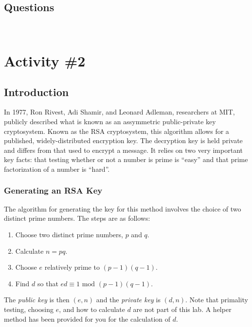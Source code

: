 		\subsection{Questions}
			\ \\[9pt]
	\pagebreak

	\section{Activity \#2}
		\subsection{Introduction}
			In 1977, Ron Rivest, Adi Shamir, and Leonard Adleman, researchers at MIT, publicly described what is known as an assymmetric public-private key cryptosystem. Known as the RSA cryptosystem, this algorithm allows for a published, widely-distributed encryption key. The decryption key is held private and differs from that used to encrypt a message. It relies on two very important key facts: that testing whether or not a number is prime is ``easy'' and that prime factorization of a number is ``hard''.

			\subsubsection*{Generating an RSA Key}
				The algorithm for generating the key for this method involves the choice of two distinct prime numbers. The steps are as follows:
					\begin{enumerate}
						\item Choose two distinct prime numbers, $p$ and $q$.
						\item Calculate $n = pq$.
						\item Choose $e$ relatively prime to $(p - 1)(q - 1)$.
						\item Find $d$ so that $ed \equiv 1\text{ mod } (p - 1)(q - 1)$.
					\end{enumerate}
				The \emph{public key} is then $(e, n)$ and the \emph{private key} is $(d, n)$. Note that primality testing, choosing $e$, and how to calculate $d$ are not part of this lab. A helper method has been provided for you for the calculation of $d$.

